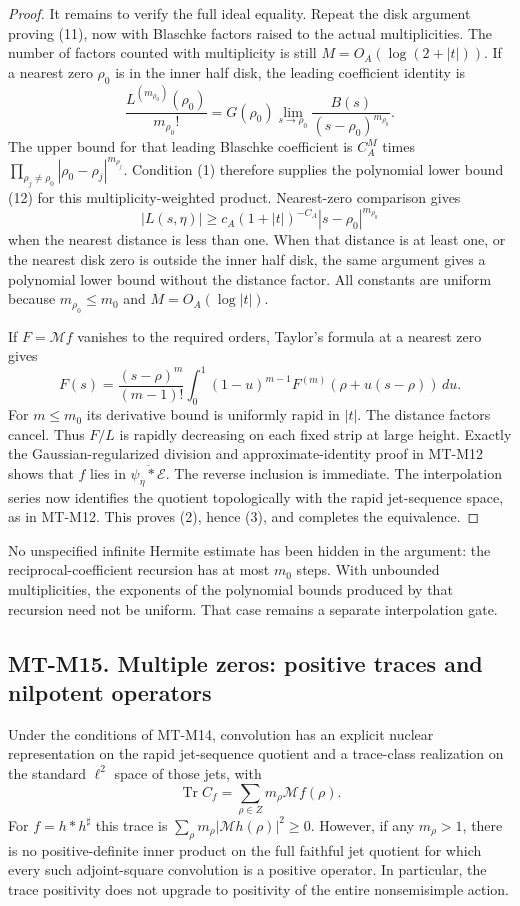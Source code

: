 \documentclass[11pt,a4paper]{article}
\begin{document}
\begin{proof}
It remains to verify the full ideal equality.
Repeat the disk argument proving (11), now with
Blaschke factors raised to the actual multiplicities.
The number of factors counted with multiplicity is still
$M=O_A(\log(2+|t|))$. If a nearest zero $\rho_0$
is in the inner half disk, the leading coefficient
identity is
\[
 \frac{L^{(m_{\rho_0})}(\rho_0)}{m_{\rho_0}!}
   =G(\rho_0)
       \lim_{s\to\rho_0}
                    \frac{B(s)}{(s-\rho_0)^{m_{\rho_0}}}.
\]
The upper bound for that leading Blaschke coefficient
is $C_A^M$ times
$\prod_{\rho_j\ne\rho_0}
          |\rho_0-\rho_j|^{m_{\rho_j}}$.
Condition (1) therefore supplies the polynomial lower
bound (12) for this multiplicity-weighted product.
Nearest-zero comparison gives
\[
 |L(s,\eta)|\ge c_A(1+|t|)^{-C_A}
                         |s-\rho_0|^{m_{\rho_0}}
\]
when the nearest distance is less than one.
When that distance is at least one, or the nearest
disk zero is outside the inner half disk, the same
argument gives a polynomial lower bound without
the distance factor. All constants are uniform
because $m_{\rho_0}\le m_0$ and $M=O_A(\log|t|)$.

If $F=\mathcal Mf$ vanishes to the required orders,
Taylor's formula at a nearest zero gives
\[
 F(s)=\frac{(s-\rho)^m}{(m-1)!}
       \int_0^1(1-u)^{m-1}
                         F^{(m)}(\rho+u(s-\rho))\,du .
\]
For $m\le m_0$ its derivative bound is uniformly
rapid in $|t|$. The distance factors cancel.
Thus $F/L$ is rapidly decreasing on each fixed
strip at large height. Exactly the Gaussian-regularized
division and approximate-identity proof in MT-M12
shows that $f$ lies in
$\overline{\psi_\eta*\mathcal E}$.
The reverse inclusion is immediate.
The interpolation series now identifies the quotient
topologically with the rapid jet-sequence space,
as in MT-M12. This proves (2), hence (3), and
completes the equivalence.
\end{proof}

No unspecified infinite Hermite estimate has been hidden in
the argument: the reciprocal-coefficient recursion has at most
$m_0$ steps. With unbounded multiplicities, the exponents of
the polynomial bounds produced by that recursion need not be
uniform. That case remains a separate interpolation gate.

\subsection*{MT-M15. Multiple zeros: positive traces and nilpotent operators}
Under the conditions of MT-M14, convolution has an explicit
nuclear representation on the rapid jet-sequence quotient
and a trace-class realization on the standard $\ell^2$
space of those jets, with
\[
          \operatorname{Tr}C_f
                    =\sum_{\rho\in Z}m_\rho\mathcal Mf(\rho).
                                                               \tag{MT-M15}
\]
For $f=h*h^\sharp$ this trace is
$\sum_\rho m_\rho|\mathcal Mh(\rho)|^2\ge0$.
However, if any $m_\rho>1$, there is no positive-definite
inner product on the full faithful jet quotient for which
every such adjoint-square convolution is a positive
operator. In particular, the trace positivity does not
upgrade to positivity of the entire nonsemisimple action.
\end{document}

